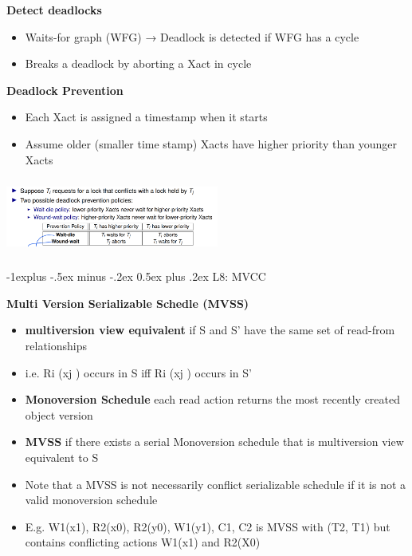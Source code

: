 \documentclass[10pt, landscape]{article}
\makeatletter
\renewcommand{\subsection}{\@startsection{subsection}{2}{0mm}%
                                {-1explus -.5ex minus -.2ex}%
                                {0.5ex plus .2ex}%
                                {\normalfont\normalsize\bfseries}}
\makeatother
\begin{document}
\begin{multicols}{4}
\textbf{Detect deadlocks} \\
\begin{itemize}
  \item Waits-for graph (WFG) → Deadlock is detected if WFG has a cycle
  \item Breaks a deadlock by aborting a Xact in cycle
\end{itemize}

\textbf{Deadlock Prevention} \\
\begin{itemize}
  \item Each Xact is assigned a timestamp when it starts
  \item Assume older (smaller time stamp) Xacts have higher priority than younger Xacts
\end{itemize}

\includegraphics[width=7cm, height =2.5cm]{deadlock_prevention.png}


\subsection{L8: MVCC}

\textbf{Multi Version Serializable Schedle (MVSS)} \\
\begin{itemize}
  \item \textbf{multiversion view equivalent} if S and S' have the same set of read-from relationships
  \item i.e. Ri (xj ) occurs in S iff Ri (xj ) occurs in S'
  \item \textbf{Monoversion Schedule} each read action returns the most recently created object version
  \item \textbf{MVSS} if there exists a serial Monoversion schedule that is multiversion view equivalent to S
  \item Note that a MVSS is not necessarily conflict serializable schedule if it is not a valid monoversion schedule
  \item E.g. W1(x1), R2(x0), R2(y0), W1(y1), C1, C2 is MVSS with (T2, T1) but contains conflicting actions W1(x1) and R2(X0)
\end{itemize}


\end{multicols}
\end{document}
